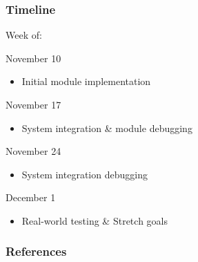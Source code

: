 \documentclass{beamer}
\begin{document}
\begin{frame}
\frametitle{Timeline}
Week of:
\begin{description}
	\item{November 10}
	\begin{itemize}
		\item Initial module implementation
	\end{itemize}
	\item{November 17}
	\begin{itemize}
		\item System integration \& module debugging
	\end{itemize}
	\item{November 24}
	\begin{itemize}
		\item System integration debugging
	\end{itemize}
	\item{December 1}
	\begin{itemize}
		\item Real-world testing \& Stretch goals
	\end{itemize}
\end{description}
\end{frame}

\begin{frame}
\frametitle{References}


\end{frame}
\end{document}
